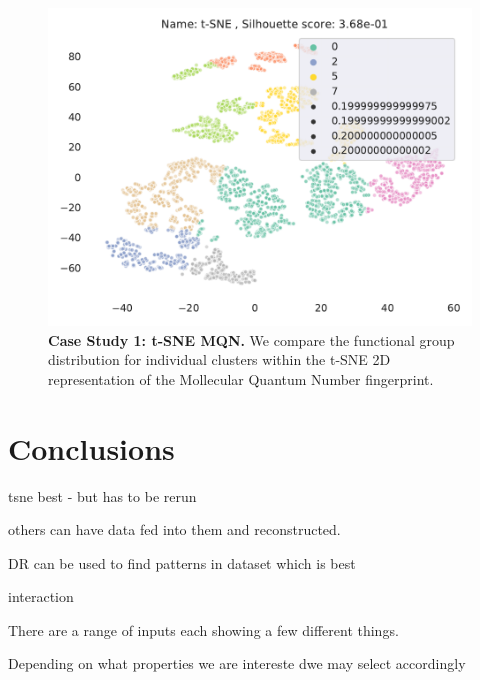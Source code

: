 \begin{figure}[H]
    \centering
    \includegraphics[width=\textwidth]{outputs/t-SNE/mqn_all.pdf}
    \caption{\textbf{Case Study 1: t-SNE MQN.} We compare the functional group distribution for individual clusters within the t-SNE 2D representation of the Mollecular Quantum Number fingerprint.}
    \label{fig:tsnemqncase}
\end{figure}









\section{Conclusions}

tsne best - but has to be rerun

others can have data fed into them and reconstructed.




DR can be used to find patterns in dataset
which is best

interaction

There are a range of inputs
each showing a few different things.

Depending on what properties we are intereste dwe may select accordingly
